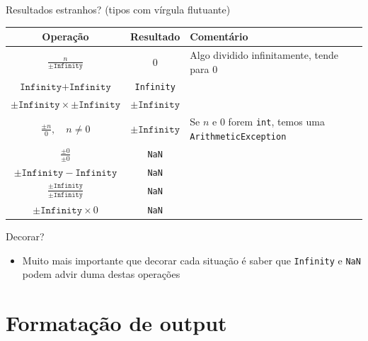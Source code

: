 \documentclass[portuguese, aspectratio=169, xcolor=table]{beamer}
\begin{document}
\begin{frame}{Resultados estranhos? (tipos com vírgula flutuante)}
\begin{center}
    \begin{tabular}{ccl}
\textbf{Operação} & \textbf{Resultado} & \textbf{Comentário}\\
\hline
$\frac{n}{\pm \texttt{Infinity}}$ & 0 & Algo dividido infinitamente, tende para 0\\
$\texttt{Infinity}  + \texttt{Infinity}$  &  \texttt{Infinity} & \\
$\pm \texttt{Infinity} \times \pm \texttt{Infinity}$ & $\pm \texttt{Infinity}$\\
$\frac{\pm n}{0}, \quad n \neq 0$        &   $\pm \texttt{Infinity}$ & \scriptsize Se $n$ e 0 forem \texttt{int}, temos uma \texttt{ArithmeticException}\\
$\frac{\pm 0}{\pm 0}$      &  \texttt{NaN}\\
$\pm \texttt{Infinity} - \texttt{Infinity}$ &   \texttt{NaN}\\
$\frac{\pm \texttt{Infinity}}{\pm \texttt{Infinity}}$  & \texttt{NaN}\\
$\pm \texttt{Infinity} \times 0$      &  \texttt{NaN}\\
\end{tabular}
\end{center}
\begin{block}{Decorar?}
\begin{itemize}
    \item Muito mais importante que decorar cada situação é saber que \texttt{Infinity} e \texttt{NaN} podem advir duma destas operações
\end{itemize}
\end{block}
\end{frame}

\section{Formatação de output}
\end{document}
